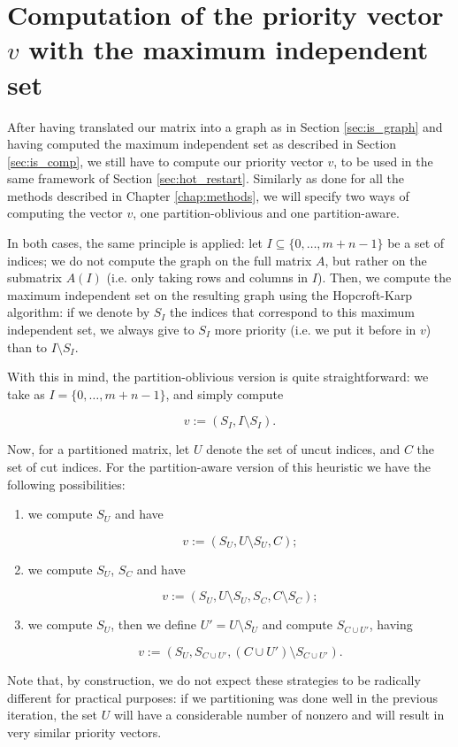 \section{Computation of the priority vector $v$ with the maximum independent set}

After having translated our matrix into a graph as in Section \ref{sec:is_graph} and having computed the maximum independent set as described in Section \ref{sec:is_comp}, we still have to compute our priority vector $v$, to be used in the same framework of Section \ref{sec:hot_restart}. Similarly as done for all the methods described in Chapter \ref{chap:methods}, we will specify two ways of computing the vector $v$, one partition-oblivious and one partition-aware.

In both cases, the same principle is applied: let $I \subseteq \{ 0,\dots,m+n-1\}$ be a set of indices; we do not compute the graph on the full matrix $A$, but rather on the submatrix $A(I)$ (i.e. only taking rows and columns in $I$). Then, we compute the maximum independent set on the resulting graph using the Hopcroft-Karp algorithm: if we denote by $S_I$ the indices that correspond to this maximum independent set, we always give to $S_I$ more priority (i.e. we put it before in $v$) than to $I \setminus S_I$. 

With this in mind, the partition-oblivious version is quite straightforward: we take as $I = \{ 0,\dots,m+n-1\}$, and simply compute

\[
	v := (S_I,I \setminus S_I).
\]

Now, for a partitioned matrix, let $U$ denote the set of uncut indices, and $C$ the set of cut indices. For the partition-aware version of this heuristic we have the following possibilities:

\begin{enumerate}
	\item we compute $S_U$ and have 

		$$v := (S_U,U \setminus S_U, C);$$

	\item we compute $S_U$, $S_C$ and have

		$$v := (S_U, U \setminus S_U, S_C, C \setminus S_C);$$

	\item we compute $S_U$, then we define $U' = U \setminus S_U$ and compute $S_{C \cup U'}$, having

		\[
			v:= (S_U, S_{C \cup U'}, (C \cup U') \setminus S_{C \cup U'}).
		\]
\end{enumerate}

Note that, by construction, we do not expect these strategies to be radically different for practical purposes: if we partitioning was done well in the previous iteration, the set $U$ will have a considerable number of nonzero and will result in very similar priority vectors.

